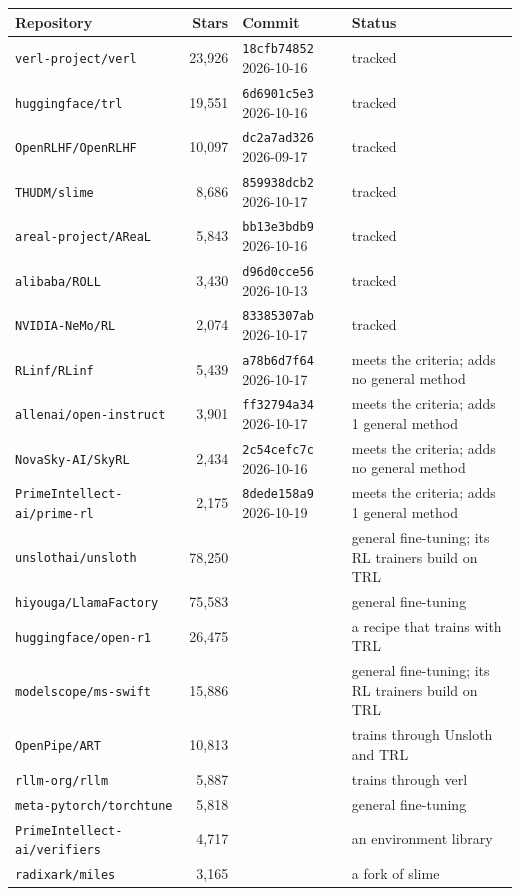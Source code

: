 \begin{tabularx}{\linewidth}{@{}l r l >{\raggedright\arraybackslash}X@{}}
\toprule
Repository & Stars & Commit & Status \\
\midrule
\texttt{verl-project/verl} & 23,926 & \texttt{18cfb74852} 2026-10-16 & tracked \\
\texttt{huggingface/trl} & 19,551 & \texttt{6d6901c5e3} 2026-10-16 & tracked \\
\texttt{OpenRLHF/OpenRLHF} & 10,097 & \texttt{dc2a7ad326} 2026-09-17 & tracked \\
\texttt{THUDM/slime} & 8,686 & \texttt{859938dcb2} 2026-10-17 & tracked \\
\texttt{areal-project/AReaL} & 5,843 & \texttt{bb13e3bdb9} 2026-10-16 & tracked \\
\texttt{alibaba/ROLL} & 3,430 & \texttt{d96d0cce56} 2026-10-13 & tracked \\
\texttt{NVIDIA-NeMo/RL} & 2,074 & \texttt{83385307ab} 2026-10-17 & tracked \\
\texttt{RLinf/RLinf} & 5,439 & \texttt{a78b6d7f64} 2026-10-17 & meets the criteria; adds no general method \\
\texttt{allenai/open-instruct} & 3,901 & \texttt{ff32794a34} 2026-10-17 & meets the criteria; adds 1 general method \\
\texttt{NovaSky-AI/SkyRL} & 2,434 & \texttt{2c54cefc7c} 2026-10-16 & meets the criteria; adds no general method \\
\texttt{PrimeIntellect-ai/prime-rl} & 2,175 & \texttt{8dede158a9} 2026-10-19 & meets the criteria; adds 1 general method \\
\texttt{unslothai/unsloth} & 78,250 &  & general fine-tuning; its RL trainers build on TRL \\
\texttt{hiyouga/LlamaFactory} & 75,583 &  & general fine-tuning \\
\texttt{huggingface/open-r1} & 26,475 &  & a recipe that trains with TRL \\
\texttt{modelscope/ms-swift} & 15,886 &  & general fine-tuning; its RL trainers build on TRL \\
\texttt{OpenPipe/ART} & 10,813 &  & trains through Unsloth and TRL \\
\texttt{rllm-org/rllm} & 5,887 &  & trains through verl \\
\texttt{meta-pytorch/torchtune} & 5,818 &  & general fine-tuning \\
\texttt{PrimeIntellect-ai/verifiers} & 4,717 &  & an environment library \\
\texttt{radixark/miles} & 3,165 &  & a fork of slime \\
\bottomrule
\end{tabularx}
